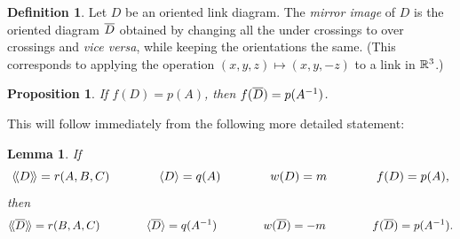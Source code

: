 \documentclass[reqno]{amsart}
\newtheorem{lemma}[theorem]{Lemma}
\newtheorem{proposition}[theorem]{Proposition}
\theoremstyle{definition}
\newtheorem{definition}[theorem]{Definition}
\begin{document}
\begin{definition}
 Let $D$ be an oriented link diagram.  The \emph{mirror image} of $D$
 is the oriented diagram $\overline{D}$ obtained by changing all the under
 crossings to over crossings and \emph{vice versa}, while keeping the
 orientations the same.  (This corresponds to applying the operation
 $(x,y,z)\mapsto(x,y,-z)$ to a link in $\mathbb{R}^3$.)  
\end{definition}

\begin{proposition}\label{prop-mirror}
 If $f(D)=p(A)$, then $f(\overline{D})=p(A^{-1})$.
\end{proposition}

This will follow immediately from the following more detailed
statement:
\begin{lemma}\label{lem-mirror}
 If
 \[ \langle\!\langle D\rangle\!\rangle=r(A,B,C) \hspace{4em}
    \langle D\rangle=q(A)     \hspace{4em}
    w(D)=m          \hspace{4em}
    f(D)=p(A),
 \]
 then 
 \[ \langle\!\langle \overline{D}\rangle\!\rangle=r(B,A,C)  \hspace{4em}
    \langle \overline{D}\rangle=q(A^{-1}) \hspace{4em}
    w(\overline{D})=-m          \hspace{4em}
    f(\overline{D})=p(A^{-1}).
 \]
\end{lemma}
\end{document}
